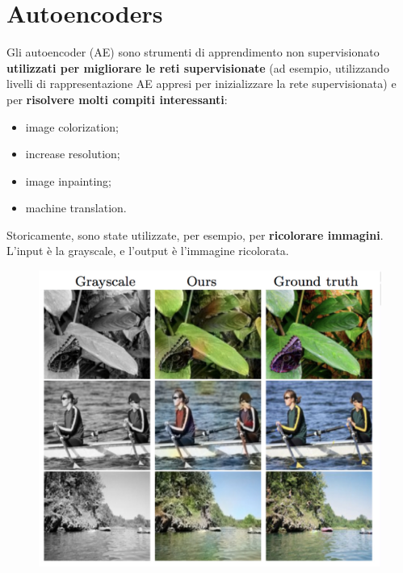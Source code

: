 \chapter{Autoencoders}
Gli autoencoder (AE) sono strumenti di apprendimento non supervisionato \textbf{utilizzati per migliorare le 
reti supervisionate} (ad esempio, utilizzando livelli di rappresentazione AE appresi per inizializzare la rete
supervisionata) e per \textbf{risolvere molti compiti interessanti}:
\begin{itemize}
  \item image colorization;
  \item increase resolution;
  \item image inpainting;
  \item machine translation.
\end{itemize}



Storicamente, sono state utilizzate, per esempio, per \textbf{ricolorare immagini}. L'input è la grayscale, 
e l'output è l'immagine ricolorata.
\begin{figure}[!h]
  \centering
  \includegraphics[scale=.3]{images/autoencoders/colorization.png}
\end{figure}

